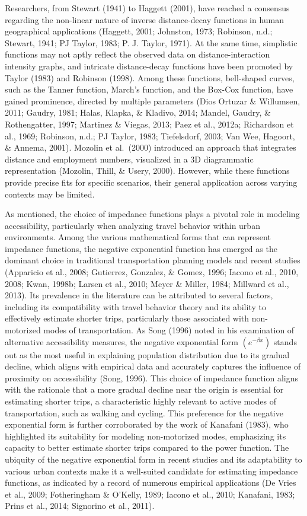 \documentclass[
11pt, %
oneside, %
english, %
singlespacing, %
]{macthesis} %
\begin{document}
Researchers, from Stewart (1941) to Haggett (2001), have reached a consensus regarding the non-linear nature of inverse distance-decay functions in human geographical applications (Haggett, 2001; Johnston, 1973; Robinson, n.d.; Stewart, 1941; PJ Taylor, 1983; P. J. Taylor, 1971). At the same time, simplistic functions may not aptly reflect the observed data on distance-interaction intensity graphs, and intricate distance-decay functions have been promoted by Taylor (1983) and Robinson (1998). Among these functions, bell-shaped curves, such as the Tanner function, March's function, and the Box-Cox function, have gained prominence, directed by multiple parameters (Dios Ortuzar \& Willumsen, 2011; Gaudry, 1981; Halas, Klapka, \& Kladivo, 2014; Mandel, Gaudry, \& Rothengatter, 1997; Martinez \& Viegas, 2013; Paez et al., 2012a; Richardson et al., 1969; Robinson, n.d.; PJ Taylor, 1983; Tiefelsdorf, 2003; Van Wee, Hagoort, \& Annema, 2001). Mozolin et al.~(2000) introduced an approach that integrates distance and employment numbers, visualized in a 3D diagrammatic representation (Mozolin, Thill, \& Usery, 2000). However, while these functions provide precise fits for specific scenarios, their general application across varying contexts may be limited.

As mentioned, the choice of impedance functions plays a pivotal role in modeling accessibility, particularly when analyzing travel behavior within urban environments. Among the various mathematical forms that can represent impedance functions, the negative exponential function has emerged as the dominant choice in traditional transportation planning models and recent studies (Apparicio et al., 2008; Gutierrez, Gonzalez, \& Gomez, 1996; Iacono et al., 2010, 2008; Kwan, 1998b; Larsen et al., 2010; Meyer \& Miller, 1984; Millward et al., 2013). Its prevalence in the literature can be attributed to several factors, including its compatibility with travel behavior theory and its ability to effectively estimate shorter trips, particularly those associated with non-motorized modes of transportation. As Song (1996) noted in his examination of alternative accessibility measures, the negative exponential form \((e ^ {-\beta x})\) stands out as the most useful in explaining population distribution due to its gradual decline, which aligns with empirical data and accurately captures the influence of proximity on accessibility (Song, 1996). This choice of impedance function aligns with the rationale that a more gradual decline near the origin is essential for estimating shorter trips, a characteristic highly relevant to active modes of transportation, such as walking and cycling. This preference for the negative exponential form is further corroborated by the work of Kanafani (1983), who highlighted its suitability for modeling non-motorized modes, emphasizing its capacity to better estimate shorter trips compared to the power function. The ubiquity of the negative exponential form in recent studies and its adaptability to various urban contexts make it a well-suited candidate for estimating impedance functions, as indicated by a record of numerous empirical applications (De Vries et al., 2009; Fotheringham \& O'Kelly, 1989; Iacono et al., 2010; Kanafani, 1983; Prins et al., 2014; Signorino et al., 2011).
\end{document}
